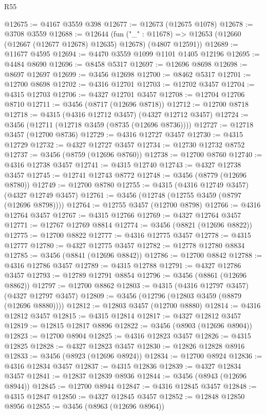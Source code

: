 \begin{lexlean}{R55}
\begin{coremodule}
@12675 := @4167 @3559 @398
@12677 := @12673 (@12675 @1078)
@12678 := @3708 @3559
@12688 := @12644
    (fun ("_" : @11678) => @12653 (@12660 (@12667 (@12677 @12678) @12635) @12678) (@4807 @12591))
@12689 := @11677 @4595
@12694 := @4470 @3559 @1099 @1101 @1405 @12196
@12695 := @4484 @8690
@12696 := @8458 @5317
@12697 := @12696 @8698
@12698 := @8697 @12697
@12699 := @3456 @12698
@12700 := @8462 @5317
@12701 := @12700 @8698
@12702 := @4316 @12701
@12703 := @12702 @3457
@12704 := @4315 @12703
@12706 := @4327 @12701 @3457
@12708 := @12704 @12706 @8710
@12711 := @3456 (@8717 (@12696 @8718))
@12712 := @12700 @8718
@12718 := @4315 (@4316 @12712 @3457) (@4327 @12712 @3457)
@12724 := @3456 (@12711 (@12718 @3459 (@8735 (@12696 @8736))))
@12727 := @12718 @3457 (@12700 @8736)
@12729 := @4316 @12727 @3457
@12730 := @4315 @12729
@12732 := @4327 @12727 @3457
@12734 := @12730 @12732 @8752
@12737 := @3456 (@8759 (@12696 @8760))
@12738 := @12700 @8760
@12740 := @4316 @12738 @3457
@12741 := @4315 @12740
@12743 := @4327 @12738 @3457
@12745 := @12741 @12743 @8772
@12748 := @3456 (@8779 (@12696 @8780))
@12749 := @12700 @8780
@12755 := @4315 (@4316 @12749 @3457) (@4327 @12749 @3457)
@12761 := @3456 (@12748 (@12755 @3459 (@8797 (@12696 @8798))))
@12764 := @12755 @3457 (@12700 @8798)
@12766 := @4316 @12764 @3457
@12767 := @4315 @12766
@12769 := @4327 @12764 @3457
@12771 := @12767 @12769 @8814
@12774 := @3456 (@8821 (@12696 @8822))
@12775 := @12700 @8822
@12777 := @4316 @12775 @3457
@12778 := @4315 @12777
@12780 := @4327 @12775 @3457
@12782 := @12778 @12780 @8834
@12785 := @3456 (@8841 (@12696 @8842))
@12786 := @12700 @8842
@12788 := @4316 @12786 @3457
@12789 := @4315 @12788
@12791 := @4327 @12786 @3457
@12793 := @12789 @12791 @8854
@12796 := @3456 (@8861 (@12696 @8862))
@12797 := @12700 @8862
@12803 := @4315 (@4316 @12797 @3457) (@4327 @12797 @3457)
@12809 := @3456 (@12796 (@12803 @3459 (@8879 (@12696 @8880))))
@12812 := @12803 @3457 (@12700 @8880)
@12814 := @4316 @12812 @3457
@12815 := @4315 @12814
@12817 := @4327 @12812 @3457
@12819 := @12815 @12817 @8896
@12822 := @3456 (@8903 (@12696 @8904))
@12823 := @12700 @8904
@12825 := @4316 @12823 @3457
@12826 := @4315 @12825
@12828 := @4327 @12823 @3457
@12830 := @12826 @12828 @8916
@12833 := @3456 (@8923 (@12696 @8924))
@12834 := @12700 @8924
@12836 := @4316 @12834 @3457
@12837 := @4315 @12836
@12839 := @4327 @12834 @3457
@12841 := @12837 @12839 @8936
@12844 := @3456 (@8943 (@12696 @8944))
@12845 := @12700 @8944
@12847 := @4316 @12845 @3457
@12848 := @4315 @12847
@12850 := @4327 @12845 @3457
@12852 := @12848 @12850 @8956
@12855 := @3456 (@8963 (@12696 @8964))

\end{coremodule}
\end{lexlean}

